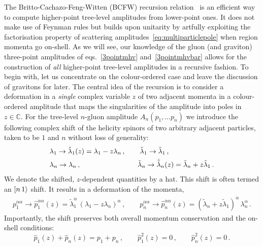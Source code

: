 The Britto-Cachazo-Feng-Witten (BCFW) recursion relation~\cite{ch2_Britto:2004ap,ch2_Britto:2005fq} 
is an efficient way
to compute higher-point tree-level amplitudes
from lower-point ones. It does not make use of Feynman rules but builds upon
unitarity by artfully exploiting the
factorisation property of scattering amplitudes~\eqref{eq:multiparticlepole}
when region momenta go on-shell.
As we will see, our knowledge of the gluon (and graviton) three-point amplitudes 
of eqs.~\eqref{3pointmhv} and~\eqref{3pointmhvbar} allows for the construction of {\it all} higher-point tree-level amplitudes in a recursive fashion.
To begin with, let us concentrate on the colour-ordered case and leave the discussion of
gravitons for later. 
The central idea of the recursion is to consider a deformation 
in a {\it  single} complex variable $z$ of two adjacent momenta in a colour-ordered
 amplitude that maps
the  singularities of the amplitude into poles in  $z \in {\mathbb{C}}$.
For the tree-level $n$-gluon amplitude $A_{n}( p_{1}, \ldots p_{n})$ we introduce
the following complex shift of the helicity spinors
of two arbitrary adjacent particles, taken to be $1$ and $n$ without loss of generality:
\begin{align} \label{bcfw-n1}
\begin{split}
&\lambda_1 \rightarrow \hat{\lambda}_{1}(z) = \lambda_{1} - z \lambda_{n} \,, \qquad  \tilde\lambda_{1}\rightarrow
\tilde\lambda_{1} \, ,  \\
&\lambda_{n}\rightarrow
\lambda_{n} \, , \qquad\qquad \qquad \qquad 
\tilde{\lambda}_n \rightarrow \hat{\tilde\lambda}_{n}(z) = \tilde{\lambda}_{n} + z \tilde{\lambda}_{1} \, . 
\end{split}
\end{align}
We denote the shifted, $z$-dependent quantities by a hat.
This shift is often termed an $[n\, 1\rangle$ shift.
It results in a  deformation of the  momenta, 
\begin{align}
\label{complexmamienta}
p_{1}^{\dot\alpha {\alpha}} \to \hat{p}_{1}^{\dot\alpha {\alpha}} (z) = 
\tilde{\lambda}_{1}^{\dot\alpha}\, (\lambda_{1} -z \lambda_{n})^{\alpha}  \,,\qquad
p_{n}^{\dot\alpha {\alpha}} \to \hat{p}_{n}^{\dot\alpha {\alpha}} (z) = (\tilde{\lambda}_{n} + z  \tilde{\lambda}_{1} )^{\dot\alpha}\, \lambda_{n}^{\alpha}  \,.
\end{align}
Importantly, the shift preserves both overall
 momentum conservation and the on-shell conditions:
\begin{equation}
\label{preservedpids}
\hat{p}_{1}(z) + \hat{p}_{n}(z) = p_{1} + p_{n}\, , \qquad 
\hat{p}_{1}^2(z) = 0\,,\qquad \hat{p}_{n}^{2}(z) = 0\, . 
\end{equation}

